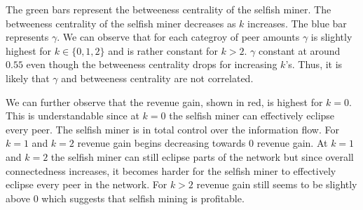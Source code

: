 The green bars represent the betweeness centrality of the selfish miner. The betweeness centrality of the selfish miner decreases as $k$ increases. The blue bar represents $\gamma$. We can observe that for each categroy of peer amounts $\gamma$ is slightly highest for $k \in \{0,1,2\}$ and is rather constant for $k>2$. $\gamma$  constant at around $0.55$ even though the betweeness centrality drops for increasing $k$'s. Thus, it is likely that $\gamma$ and  betweeness centrality are not correlated.

We can further observe that the revenue gain, shown in red, is highest for $k=0$. This is understandable since at $k=0$ the selfish miner can effectively eclipse every peer. The selfish miner is in total control over the information flow. For $k=1$ and $k=2$ revenue gain begins decreasing towards $0$ revenue gain. At $k=1$ and $k=2$ the selfish miner can still eclipse parts of the network but since overall connectedness increases, it becomes harder for the selfish miner to effectively eclipse every peer in the network. For $k>2$ revenue gain still seems to be slightly above $0$ which suggests that selfish mining is profitable.


\fi



















